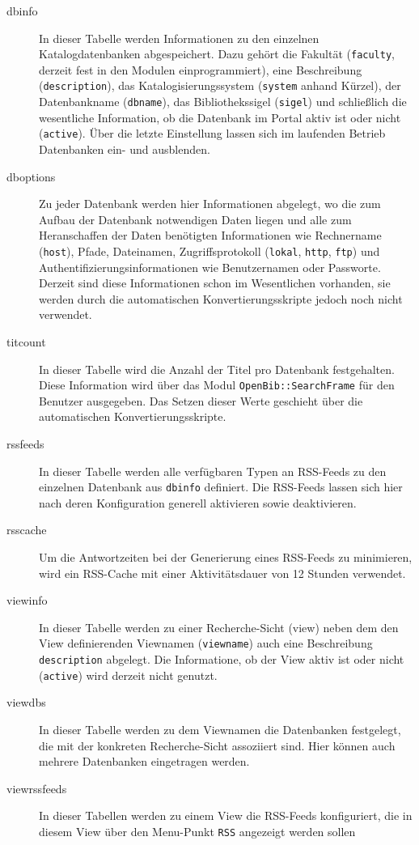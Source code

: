 \documentclass[11pt, twoside, a4paper, BCOR8mm, DIV12, bibtotoc,idxtotoc]{scrbook}
\begin{document}
\begin{description}
\item[dbinfo] In dieser Tabelle werden Informationen zu den einzelnen
  Katalogdatenbanken ab\-ge\-spei\-chert. Dazu gehört die Fakultät
  (\texttt{faculty}, derzeit fest in den Modulen einprogrammiert),
  eine Beschreibung (\texttt{description}), das Katalogisierungssystem
  (\texttt{system} anhand Kürzel), der Datenbankname
  (\texttt{dbname}), das Bibliothekssigel (\texttt{sigel}) und
  schließlich die wesentliche Information, ob die Daten\-bank im Portal
  aktiv ist oder nicht (\texttt{active}). Über die letzte Einstellung
  lassen sich im laufenden Betrieb Daten\-banken ein- und ausblenden.
\item[dboptions] Zu jeder Daten\-bank werden hier Informationen
  abgelegt, wo die zum Aufbau der Daten\-bank notwendigen Daten liegen
  und alle zum Heranschaffen der Daten benötigten Informationen wie
  Rechnername (\texttt{host}), Pfade, Dateinamen, Zugriffsprotokoll
  (\texttt{lokal}, \texttt{http}, \texttt{ftp}) und
  Authentifizierungsinformationen wie Benutzernamen oder Passworte.
  Derzeit sind diese Informationen schon im Wesentlichen vorhanden,
  sie werden durch die automatischen Konvertierungsskripte jedoch noch
  nicht verwendet.
\item[titcount] In dieser Tabelle wird die Anzahl der Titel pro
  Daten\-bank festgehalten. Diese Information wird über das Modul
  \texttt{OpenBib::SearchFrame} für den Benutzer ausgegeben. Das Setzen
  dieser Werte geschieht über die automatischen
  Konvertierungsskripte.
\item[rssfeeds] In dieser Tabelle werden alle verfügbaren Typen an RSS-Feeds
  zu den einzelnen Daten\-bank aus \texttt{dbinfo} definiert. Die
  RSS-Feeds lassen sich hier nach deren Konfiguration generell
  aktivieren sowie deaktivieren.
\item[rsscache] Um die Antwortzeiten bei der Generierung eines
  RSS-Feeds zu minimieren, wird ein RSS-Cache mit einer
  Aktivitätsdauer von 12 Stunden verwendet.
\item[viewinfo] In dieser Tabelle werden zu einer Recherche-Sicht
  (view) neben dem den View de\-fi\-nier\-enden Viewnamen
  (\texttt{viewname}) auch eine Beschreibung \texttt{description}
  abgelegt. Die Informatione, ob der View aktiv ist oder nicht
  (\texttt{active}) wird derzeit nicht genutzt.
\item[viewdbs] In dieser Tabelle werden zu dem Viewnamen die Daten\-banken
  festgelegt, die mit der konkreten Recherche-Sicht assoziiert
  sind. Hier können auch mehrere Daten\-banken ein\-ge\-tra\-gen werden.
\item[viewrssfeeds] In dieser Tabellen werden zu einem View die
  RSS-Feeds konfiguriert, die in diesem View über den Menu-Punkt
  \texttt{RSS} angezeigt werden sollen

\end{description}
\end{document}
